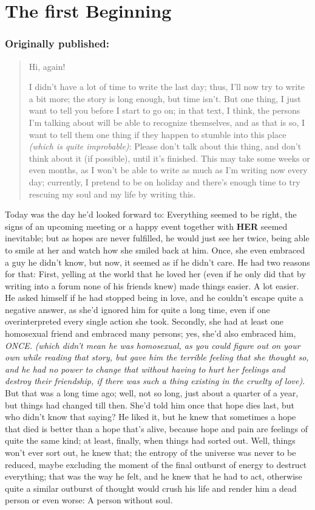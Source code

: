 \chapter{The first Beginning}
\label{cha:the-first-beginning}
\subsection*{Originally published: }
\begin{quote}
Hi, again!

I didn't have a lot of time to write the last day; thus, I'll now try to write a bit more; the story is long enough, but time isn't. 
But one thing, I just want to tell you before I start to go on; in that text, I think, the persons I'm talking about will be able to recognize themselves, and as that is so, I want to tell them one thing if they happen to stumble into this place \emph{(which is quite improbable)}: Please don't talk about this thing, and don't think about it (if possible), until it's finished. This may take some weeks or even months, as I won't be able to write as much as I'm writing now every day; currently, I pretend to be on holiday and there's enough time to try rescuing my soul and my life by writing this. 
\end{quote}

Today was the day he'd looked forward to: Everything seemed to be right, the signs of an upcoming meeting or a happy event together with \textbf{HER} seemed inevitable; but as hopes are never fulfilled, he would just see her twice, being able to smile at her and watch how she smiled back at him. Once, she even embraced a guy he didn't know, but now, it seemed as if he didn't care. He had two reasons for that: First, yelling at the world that he loved her (even if he only did that by writing into a forum none of his friends knew) made things easier. A lot easier. He asked himself if he had stopped being in love, and he couldn't escape quite a negative answer, as she'd ignored him for quite a long time, even if one overinterpreted every single action she took. Secondly, she had at least one homosexual friend and embraced many persons; yes, she'd also embraced him, \emph{ONCE.} \emph{(which didn't mean he was homosexual, as you could figure out on your own while reading that story, but gave him the terrible feeling that she thought so, and he had no power to change that without having to hurt her feelings and destroy their friendship, if there was such a thing existing in the cruelty of love)}. But that was a long time ago; well, not so long, just about a quarter of a year, but things had changed till then. She'd told him once that hope dies last, but who didn't know that saying? He liked it, but he knew that sometimes a hope that died is better than a hope that's alive, because hope and pain are feelings of quite the same kind; at least, finally, when things had sorted out. Well, things won't ever sort out, he knew that; the entropy of the universe was never to be reduced, maybe excluding the moment of the final outburst of energy to destruct everything; that was the way he felt, and he knew that he had to act, otherwise quite a similar outburst of thought would crush his life and render him a dead person or even worse: A person without soul.

